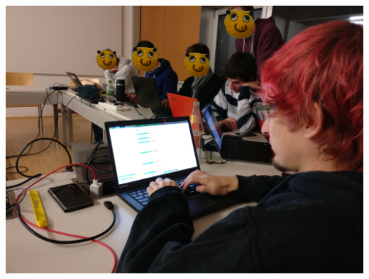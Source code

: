 \begin{frame}[plain]
\begin{columns}[T]
\begin{column}{.4\textwidth}
      \vspace{7em}

      \begin{rotate}{-7}
        \includegraphics[width=\textwidth]{../images/pwn-training-session_small.jpg}
      \end{rotate}
    \end{column}
  \end{columns}
\end{frame}

